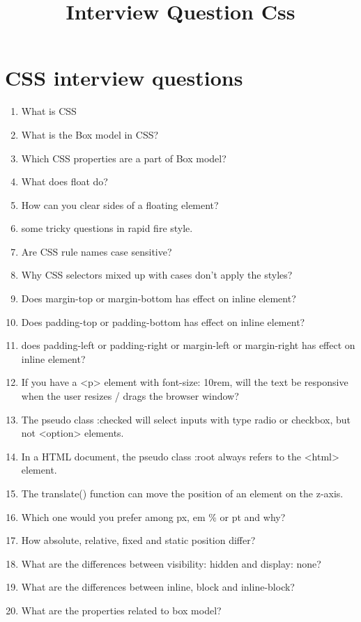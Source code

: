 \documentclass[11pt]{article}
\date{}
\title{Interview Question Css}
\begin{document}
\maketitle

\section*{CSS interview questions}
\label{sec:orgb28bc89}
\begin{enumerate}
\item What is CSS
\item What is the Box model in CSS?
\item Which CSS properties are a part of Box model?
\item What does float do?
\item How can you clear sides of a floating element?
\item some tricky questions in rapid fire style.
\item Are CSS rule names case sensitive?
\item Why CSS selectors mixed up with cases don't apply the styles?
\item Does margin-top or margin-bottom has effect on inline element?
\item Does padding-top or padding-bottom has effect on inline element?
\item does padding-left or padding-right or margin-left or margin-right has effect on inline element?
\item If you have a <p> element with font-size: 10rem, will the text be responsive when the user resizes / drags the browser window?
\item The pseudo class :checked will select inputs with type radio or checkbox, but not <option> elements.
\item In a HTML document, the pseudo class :root always refers to the <html> element.
\item The translate() function can move the position of an element on the z-axis.
\item Which one would you prefer among px, em \% or pt and why?
\item How absolute, relative, fixed and static position differ?
\item What are the differences between visibility: hidden and display: none?
\item What are the differences between inline, block and inline-block?
\item What are the properties related to box model?

\end{enumerate}
\end{document}
